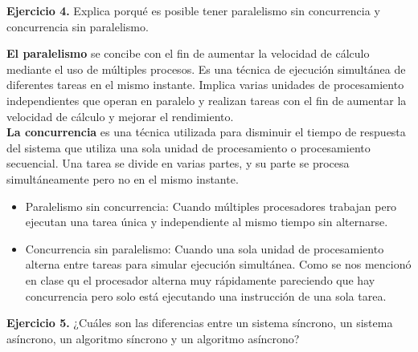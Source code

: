 \documentclass[12pt]{article}
\begin{document}
\begin{ejercicio}
\textbf{Ejercicio 4.} Explica porqué es posible tener paralelismo sin concurrencia y concurrencia sin paralelismo.
\end{ejercicio}
\textbf{El paralelismo} se concibe con el fin de aumentar la velocidad de cálculo mediante el uso de
múltiples procesos. Es una técnica de ejecución simultánea de diferentes tareas en el mismo
instante. Implica varias unidades de procesamiento independientes que operan en paralelo y
realizan tareas con el fin de aumentar la velocidad de cálculo y mejorar el rendimiento.\\
\textbf{La concurrencia} es una técnica utilizada para disminuir el tiempo de respuesta del sistema que
utiliza una sola unidad de procesamiento o procesamiento secuencial. Una tarea se divide en
varias partes, y su parte se procesa simultáneamente pero no en el mismo instante.
\begin{itemize}
    \item Paralelismo sin concurrencia: Cuando múltiples procesadores trabajan  pero ejecutan una tarea única y independiente al mismo tiempo sin alternarse.
    
    \item Concurrencia sin paralelismo: Cuando una sola unidad de procesamiento alterna entre tareas para simular ejecución simultánea. Como se nos mencionó en clase qu el procesador alterna muy rápidamente pareciendo que hay concurrencia pero solo está ejecutando una instrucción de una sola tarea.
\end{itemize}

\begin{ejercicio}
\textbf{Ejercicio 5.} ¿Cuáles son las diferencias entre un sistema síncrono, un sistema asíncrono, un algoritmo síncrono y un algoritmo asíncrono?
\end{ejercicio}
\end{document}
